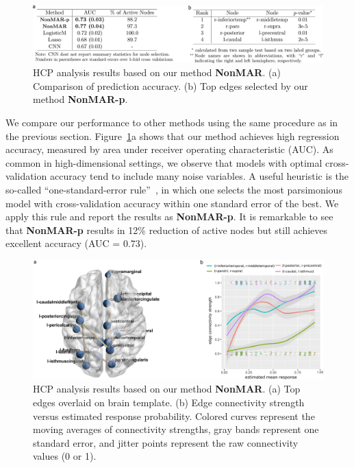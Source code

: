 \documentclass[11pt]{article}
\theoremstyle{plain}
\theoremstyle{definition}
\begin{document}
\begin{figure}[ht]
    \centering
       \includegraphics[width=\textwidth]{braintable.pdf}
 \caption{HCP analysis results based on our method {\bf \small NonMAR}. (a) Comparison of prediction accuracy. (b) Top edges selected by our method {\small \bf NonMAR-p}. }\label{fig:real}
\end{figure}

We compare our performance to other methods using the same procedure as in the previous section. Figure~\ref{fig:real}a shows that our method achieves high regression accuracy, measured by area under receiver operating characteristic (AUC). As common in high-dimensional settings, we observe that models with optimal cross-validation accuracy tend to include many noise variables. A useful heuristic is the so-called ``one-standard-error rule''~\citep{hastie2015statistical}, in which one selects the most parsimonious model with cross-validation accuracy within one standard error of the best. We apply this rule and report the results as {\bf \small NonMAR-p}. It is remarkable to see that {\bf \small NonMAR-p} results in 12\% reduction of active nodes but still achieves excellent accuracy (AUC = 0.73). 

\begin{figure}[ht]
    \centering
       \includegraphics[width=1\textwidth]{brain.pdf}
 \caption{HCP analysis results based on our method {\bf \small NonMAR}.  (a) Top edges overlaid on brain template. (b) Edge connectivity strength versus estimated response probability. Colored curves represent the moving averages of connectivity strengths, gray bands represent one standard error, and jitter points represent the raw connectivity values (0 or 1). }\label{fig:real2}
\end{figure}
\end{document}

